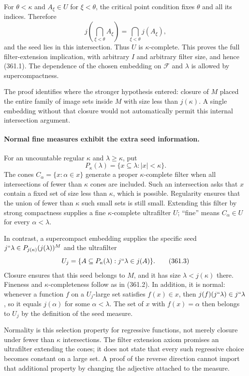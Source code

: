 \documentclass[11pt]{article}
\begin{document}
For $\theta<\kappa$ and $A_\xi\in U$ for $\xi<\theta$, the critical
point condition fixes $\theta$ and all its indices. Therefore
\[
 j\left(\bigcap_{\xi<\theta}A_\xi\right)
      =\bigcap_{\xi<\theta}j(A_\xi),
\]
and the seed lies in this intersection. Thus $U$ is
$\kappa$-complete. This proves the full filter-extension implication,
with arbitrary $I$ and arbitrary filter size, and hence (361.1).
The dependence of the chosen embedding on $\mathcal F$ and $\lambda$
is allowed by supercompactness.

The proof identifies where the stronger hypothesis entered: closure
of $M$ placed the entire family of image sets inside $M$ with size
less than $j(\kappa)$. A single embedding without that closure would
not automatically permit this internal intersection argument.

\paragraph{Normal fine measures exhibit the extra seed information.}
For an uncountable regular $\kappa$ and $\lambda\ge\kappa$, put
\[
 P_\kappa(\lambda)=\{x\subseteq\lambda:|x|<\kappa\}.
\]
The cones $C_\alpha=\{x:\alpha\in x\}$ generate a proper
$\kappa$-complete filter when all intersections of fewer than $\kappa$
cones are included. Such an intersection asks that $x$ contain a
fixed set of size less than $\kappa$, which is possible. Regularity
ensures that the union of fewer than $\kappa$ such small sets is still
small. Extending this filter by strong compactness supplies a fine
$\kappa$-complete ultrafilter $U$; ``fine'' means $C_\alpha\in U$
for every $\alpha<\lambda$.

In contrast, a supercompact embedding supplies the specific seed
$j``\lambda\in P_{j(\kappa)}(j(\lambda))^M$ and the ultrafilter
\[
 U_j=\{A\subseteq P_\kappa(\lambda):j``\lambda\in j(A)\}.
 \tag{361.3}
\]
Closure ensures that this seed belongs to $M$, and it has size
$\lambda<j(\kappa)$ there. Fineness and $\kappa$-completeness follow
as in (361.2). In addition, it is normal: whenever a function $f$
on a $U_j$-large set satisfies $f(x)\in x$, then
$j(f)(j``\lambda)\in j``\lambda$, so it equals $j(\alpha)$ for
some $\alpha<\lambda$. The set of $x$ with $f(x)=\alpha$ then
belongs to $U_j$ by the definition of the seed measure.

Normality is this selection property for regressive functions, not
merely closure under fewer than $\kappa$ intersections. The filter
extension axiom promises an ultrafilter extending the cones; it does
not state that every such regressive choice becomes constant on a
large set. A proof of the reverse direction cannot import that
additional property by changing the adjective attached to the measure.
\end{document}
